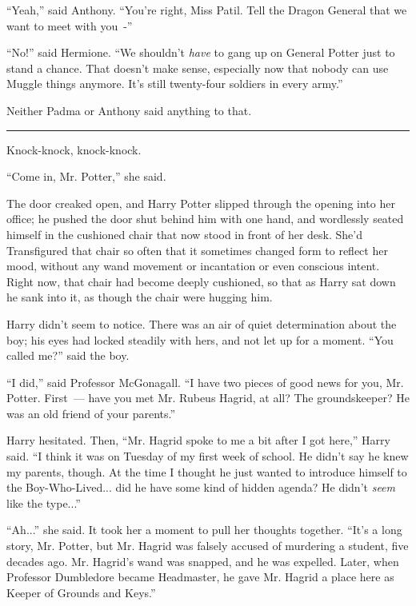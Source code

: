 ``Yeah,'' said Anthony. ``You're right, Miss Patil. Tell the Dragon General that we want to meet with you~-''

``No!'' said Hermione. ``We shouldn't \emph{have} to gang up on General Potter just to stand a chance. That doesn't make sense, especially now that nobody can use Muggle things anymore. It's still twenty-four soldiers in every army.''

Neither Padma or Anthony said anything to that.

\begin{center}\rule{3in}{0.4pt}\end{center}

Knock-knock, knock-knock.

``Come in, Mr. Potter,'' she said.

The door creaked open, and Harry Potter slipped through the opening into her office; he pushed the door shut behind him with one hand, and wordlessly seated himself in the cushioned chair that now stood in front of her desk. She'd Transfigured that chair so often that it sometimes changed form to reflect her mood, without any wand movement or incantation or even conscious intent. Right now, that chair had become deeply cushioned, so that as Harry sat down he sank into it, as though the chair were hugging him.

Harry didn't seem to notice. There was an air of quiet determination about the boy; his eyes had locked steadily with hers, and not let up for a moment. ``You called me?'' said the boy.

``I did,'' said Professor McGonagall. ``I have two pieces of good news for you, Mr. Potter. First~--- have you met Mr. Rubeus Hagrid, at all? The groundskeeper? He was an old friend of your parents.''

Harry hesitated. Then, ``Mr. Hagrid spoke to me a bit after I got here,'' Harry said. ``I think it was on Tuesday of my first week of school. He didn't say he knew my parents, though. At the time I thought he just wanted to introduce himself to the Boy-Who-Lived... did he have some kind of hidden agenda? He didn't \emph{seem} like the type...''

``Ah...'' she said. It took her a moment to pull her thoughts together. ``It's a long story, Mr. Potter, but Mr. Hagrid was falsely accused of murdering a student, five decades ago. Mr. Hagrid's wand was snapped, and he was expelled. Later, when Professor Dumbledore became Headmaster, he gave Mr. Hagrid a place here as Keeper of Grounds and Keys.''

